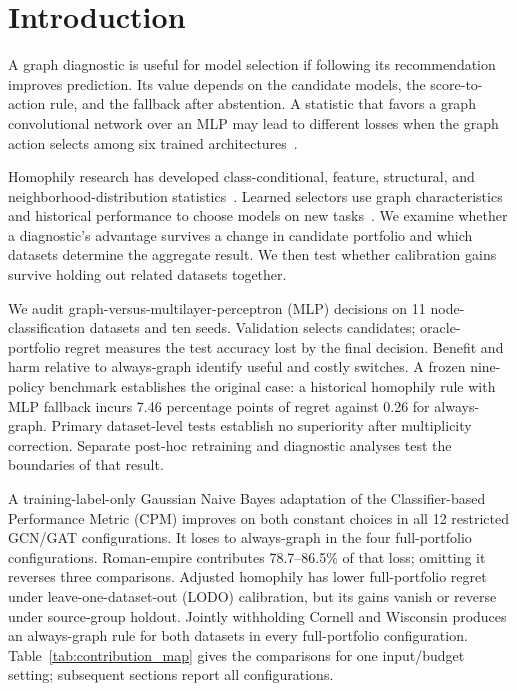 \section{Introduction}

A graph diagnostic is useful for model selection if following its recommendation improves prediction. Its value depends on the candidate models, the score-to-action rule, and the fallback after abstention. A statistic that favors a graph convolutional network over an MLP may lead to different losses when the graph action selects among six trained architectures~\citep{kipf2017gcn,velivckovic2018gat,zhu2020beyond,lim2021linkx}.

Homophily research has developed class-conditional, feature, structural, and neighborhood-distribution statistics~\citep{luan2023whendo,platonov2023characterizing,zheng2024trihom,pmlr-v235-wang24u}. Learned selectors use graph characteristics and historical performance to choose models on new tasks~\citep{park2023metagl,park2023glemos}. We examine whether a diagnostic's advantage survives a change in candidate portfolio and which datasets determine the aggregate result. We then test whether calibration gains survive holding out related datasets together.

We audit graph-versus-multilayer-perceptron (MLP) decisions on 11 node-classification datasets and ten seeds. Validation selects candidates; oracle-portfolio regret measures the test accuracy lost by the final decision. Benefit and harm relative to always-graph identify useful and costly switches. A frozen nine-policy benchmark establishes the original case: a historical homophily rule with MLP fallback incurs 7.46 percentage points of regret against 0.26 for always-graph. Primary dataset-level tests establish no superiority after multiplicity correction. Separate post-hoc retraining and diagnostic analyses test the boundaries of that result.

A training-label-only Gaussian Naive Bayes adaptation of the Classifier-based Performance Metric (CPM) improves on both constant choices in all 12 restricted GCN/GAT configurations. It loses to always-graph in the four full-portfolio configurations. Roman-empire contributes 78.7--86.5\% of that loss; omitting it reverses three comparisons. Adjusted homophily has lower full-portfolio regret under leave-one-dataset-out (LODO) calibration, but its gains vanish or reverse under source-group holdout. Jointly withholding Cornell and Wisconsin produces an always-graph rule for both datasets in every full-portfolio configuration. Table~\ref{tab:contribution_map} gives the comparisons for one input/budget setting; subsequent sections report all configurations.

